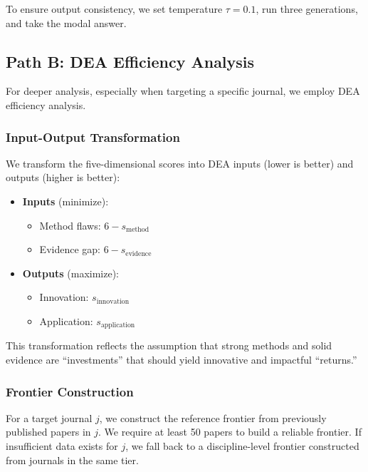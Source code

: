 \documentclass[11pt,a4paper]{article}
\newcommand{\dea}{DEA}
\begin{document}
To ensure output consistency, we set temperature $\tau = 0.1$, run three generations, and take the modal answer.

\subsection{Path B: DEA Efficiency Analysis}

For deeper analysis, especially when targeting a specific journal, we employ \dea{} efficiency analysis.

\subsubsection{Input-Output Transformation}

We transform the five-dimensional scores into \dea{} inputs (lower is better) and outputs (higher is better):

\begin{itemize}
    \item \textbf{Inputs} (minimize):
    \begin{itemize}
        \item Method flaws: $6 - s_{\text{method}}$
        \item Evidence gap: $6 - s_{\text{evidence}}$
    \end{itemize}
    \item \textbf{Outputs} (maximize):
    \begin{itemize}
        \item Innovation: $s_{\text{innovation}}$
        \item Application: $s_{\text{application}}$
    \end{itemize}
\end{itemize}

This transformation reflects the assumption that strong methods and solid evidence are ``investments'' that should yield innovative and impactful ``returns.''

\subsubsection{Frontier Construction}

For a target journal $j$, we construct the reference frontier from previously published papers in $j$. We require at least 50 papers to build a reliable frontier. If insufficient data exists for $j$, we fall back to a discipline-level frontier constructed from journals in the same tier.
\end{document}
